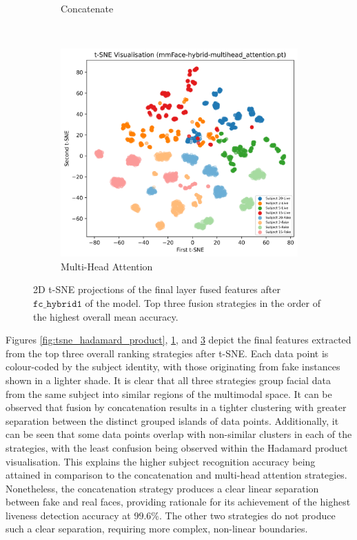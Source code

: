 \documentclass{mpaper}
\begin{document}
\begin{figure}[!t]
\begin{subfigure}[b]{0.32\textwidth}
        \caption{Concatenate}
        \label{fig:tsne_concatenate}
    \end{subfigure}
    ~\hspace{0.01cm}
    \begin{subfigure}[b]{0.32\textwidth}
        \includegraphics[width=1.06\textwidth]{figures/tsne_multihead_attention.png}
        \caption{Multi-Head Attention}
        \label{fig:tsne_multihead_attention}
    \end{subfigure}
    \vspace{0.3cm}
    \caption{2D t-SNE projections of the final layer fused features after $\mathtt{fc\_hybrid1}$ of the model. Top three fusion strategies in the order of the highest overall mean accuracy.}
\end{figure}

Figures \ref{fig:tsne_hadamard_product}, \ref{fig:tsne_concatenate}, and \ref{fig:tsne_multihead_attention} depict the final features extracted from the top three overall ranking strategies after t-SNE. Each data point is colour-coded by the subject identity, with those originating from fake instances shown in a lighter shade. It is clear that all three strategies group facial data from the same subject into similar regions of the multimodal space. It can be observed that fusion by concatenation results in a tighter clustering with greater separation between the distinct grouped islands of data points. Additionally, it can be seen that some data points overlap with non-similar clusters in each of the strategies, with the least confusion being observed within the Hadamard product visualisation. This explains the higher subject recognition accuracy being attained in comparison to the concatenation and multi-head attention strategies. Nonetheless, the concatenation strategy produces a clear linear separation between fake and real faces, providing rationale for its achievement of the highest liveness detection accuracy at 99.6\%. The other two strategies do not produce such a clear separation, requiring more complex, non-linear boundaries.
\end{document}
